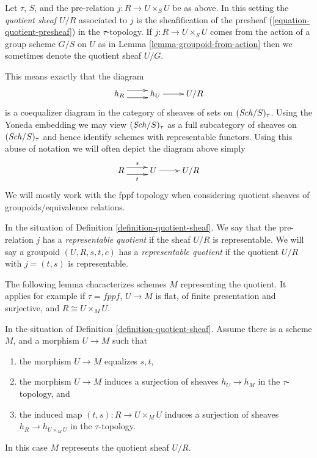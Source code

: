 \begin{definition}
\label{definition-quotient-sheaf}
Let $\tau$, $S$, and the pre-relation $j : R \to U \times_S U$ be as above.
In this setting the {\it quotient sheaf $U/R$} associated
to $j$ is the sheafification of the presheaf
(\ref{equation-quotient-presheaf}) in the $\tau$-topology.
If $j : R \to U \times_S U$ comes from the action of a group scheme
$G/S$ on $U$ as in Lemma \ref{lemma-groupoid-from-action} then we
sometimes denote the quotient sheaf $U/G$.
\end{definition}

\noindent
This means exactly that the diagram
$$
\xymatrix{
h_R \ar@<1ex>[r] \ar@<-1ex>[r] &
h_U \ar[r] &
U/R
}
$$
is a coequalizer diagram in the category of sheaves of sets
on $(\mathit{Sch}/S)_\tau$. Using the Yoneda embedding we
may view $(\mathit{Sch}/S)_\tau$ as a full subcategory of
sheaves on $(\mathit{Sch}/S)_\tau$ and hence identify schemes
with representable functors. Using this abuse of notation
we will often depict the diagram above simply
$$
\xymatrix{
R \ar@<1ex>[r]^s \ar@<-1ex>[r]_t &
U \ar[r] &
U/R
}
$$
We will mostly work with the fppf topology when considering
quotient sheaves of groupoids/equivalence relations.

\begin{definition}
\label{definition-representable-quotient}
In the situation of Definition \ref{definition-quotient-sheaf}.
We say that the pre-relation $j$ has a
{\it representable quotient} if the sheaf $U/R$ is representable.
We will say a groupoid $(U, R, s, t, c)$ has a
{\it representable quotient}
if the quotient $U/R$ with $j = (t, s)$ is representable.
\end{definition}

\noindent
The following lemma characterizes schemes $M$ representing the quotient.
It applies for example if $\tau = fppf$, $U \to M$ is flat,
of finite presentation and surjective, and $R \cong U \times_M U$.

\begin{lemma}
\label{lemma-criterion-quotient-representable}
In the situation of Definition \ref{definition-quotient-sheaf}.
Assume there is a scheme $M$, and a morphism $U \to M$ such that
\begin{enumerate}
\item the morphism $U \to M$ equalizes $s, t$,
\item the morphism $U \to M$ induces a surjection of sheaves
$h_U \to h_M$ in the $\tau$-topology, and
\item the induced map $(t, s) : R \to U \times_M U$ induces a
surjection of sheaves $h_R \to h_{U \times_M U}$ in the $\tau$-topology.
\end{enumerate}
In this case $M$ represents the quotient sheaf $U/R$.
\end{lemma}

